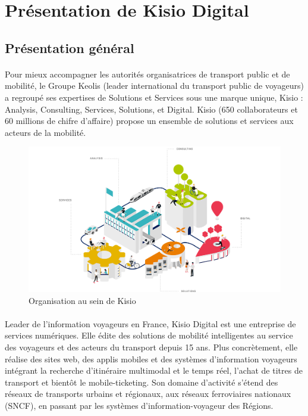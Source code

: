 \documentclass[a4paper]{report}
\begin{document}
\section{Présentation de Kisio Digital}
\subsection{Présentation général}
			
\paragraph{} Pour mieux accompagner les autorités organisatrices de transport public et de mobilité, le Groupe Keolis (leader  international du transport public de voyageurs) a regroupé ses expertises de Solutions et Services sous une marque unique, Kisio : Analysis, Consulting, Services, Solutions, et Digital. Kisio (650 collaborateurs et 60 millions de chifre d'affaire) propose un ensemble de solutions et services aux acteurs de la mobilité.

\begin{figure}[H] 
	\begin{center}
		\includegraphics[width=500pt]{image/orga_kisio}
		\caption{Organisation au sein de Kisio}
		\label{Organisation au sein de Kisio}
	\end{center}
\end{figure}

\paragraph{} Leader de l'information voyageurs en France, Kisio Digital est une entreprise de services numériques. Elle édite des solutions de mobilité intelligentes au service des voyageurs et des acteurs du transport depuis 15 ans. Plus concrètement, elle réalise  des sites web, des applis mobiles et des systèmes d’information voyageurs intégrant la recherche d’itinéraire multimodal et le temps réel, l’achat de titres de transport et bientôt le mobile-ticketing. Son domaine d’activité s’étend des réseaux de transports urbains et régionaux, aux réseaux ferroviaires nationaux (SNCF), en passant par les systèmes d’information-voyageur des Régions. 
				
\end{document}
